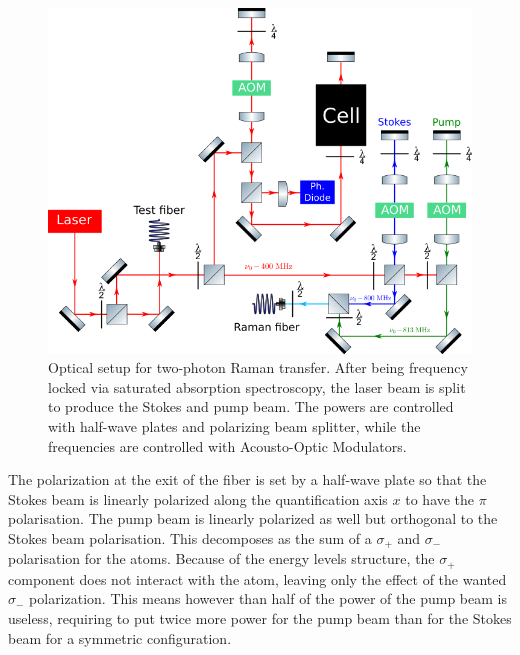 \begin{figure}
    \centering
    \includegraphics[width=\textwidth]{Fig/Chapter3/table_raman.png}
    \caption{Optical setup for two-photon Raman transfer. After being frequency locked via saturated absorption spectroscopy, the laser beam is split to produce the Stokes and pump beam. The powers are controlled with half-wave plates and polarizing beam splitter, while the frequencies are controlled with Acousto-Optic Modulators.}
    \label{fig:raman_table}
\end{figure}

The polarization at the exit of the fiber is set by a half-wave plate so that the Stokes beam is linearly polarized along the quantification axis $x$ to have the $\pi$ polarisation. The pump beam is linearly polarized as well but orthogonal to the Stokes beam polarisation. This decomposes as the sum of a $\sigma_+$ and $\sigma_-$ polarisation for the atoms. Because of the energy levels structure, the $\sigma_+$ component does not interact with the atom, leaving only the effect of the wanted $\sigma_-$ polarization. This means however than half of the power of the pump beam is useless, requiring to put twice more power for the pump beam than for the Stokes beam for a symmetric configuration.


